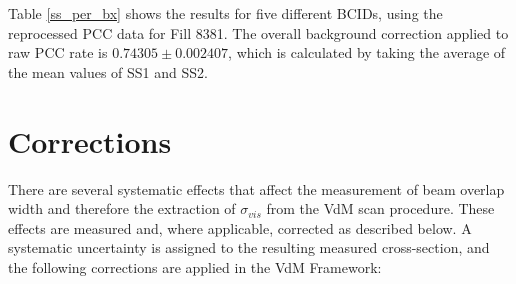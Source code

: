 Table  \ref{ss_per_bx} shows the results for five different BCIDs, using the reprocessed PCC data for Fill 8381.  The overall background correction applied to raw PCC rate is $0.74305 \pm 0.002407$, which is calculated by taking the average of the mean values of SS1 and SS2. 

\section{Corrections}

There are several systematic effects that affect the measurement of beam overlap width and therefore the extraction of $\sigma_{vis}$ from the VdM scan procedure. These effects are measured and, where applicable, corrected as described below. A systematic uncertainty is assigned to the resulting measured cross-section, and the following corrections are applied in the VdM Framework:
 
